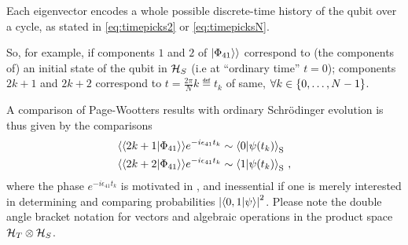 Each eigenvector encodes a whole possible discrete-time history
of the qubit over a cycle,
as stated in \eqref{eq:timepicks2} or \eqref{eq:timepicksN}.

So, for example, if components $1$ and $2$ of $|\Phi_{41}\rangle\rangle$ correspond to
(the components of)
an initial state of the qubit in $\mathcal{H}_S$
(i.e at ``ordinary time'' $t=0$); components
$2k + 1$ and $2k + 2$ correspond to $t = \frac{2\pi}{N}k \eqdef t_k$
of same, $\forall k \in \qty{0, \dots, N-1}$.

A comparison of Page-Wootters results with ordinary
Schr{\"o}dinger evolution is thus given by the comparisons
\begin{align}
  \langle\langle 2k+1 | \Phi_{41} \rangle\rangle e^{-i \epsilon_{41} t_k} &\sim \braket{0}{\psi(t_k)}_{\mathrm{S}} \label{eq:comparison0} \\
  \langle\langle 2k+2 | \Phi_{41} \rangle\rangle e^{-i \epsilon_{41} t_k} &\sim \braket{1}{\psi(t_k)}_{\mathrm{S}} \label{eq:comparison1}
  \,\text{,}
\end{align}
where the phase $e^{-i \epsilon_{41} t_k}$ is motivated in \cite[``The Zero-eigenvalue'']{Lloyd:Time},
and inessential if one is merely interested in determining and comparing probabilities
$\qty|\braket{0,1}{\psi}|^2$. Please note the double angle bracket notation for vectors
and algebraic operations in the product space $\mathcal{H}_T \otimes \mathcal{H}_S$.

